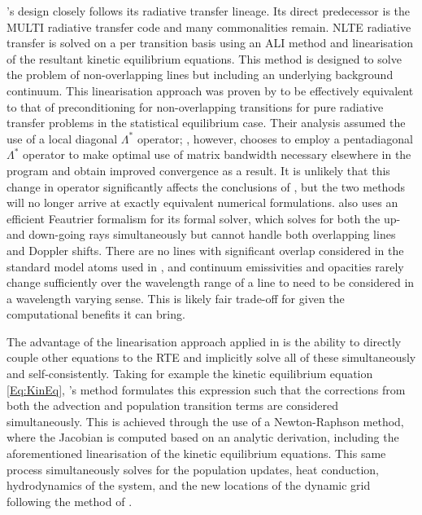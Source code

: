 \Radyn{}'s design closely follows its radiative transfer lineage. Its direct predecessor is the MULTI radiative transfer code \citep{Carlsson1992} and many commonalities remain.
NLTE radiative transfer is solved on a per transition basis using an ALI method and linearisation of the resultant kinetic equilibrium equations.
This method is designed to solve the problem of non-overlapping lines but including an underlying background continuum.
This linearisation approach was proven by \citet{SocasNavarro1997} to be effectively equivalent to that of preconditioning for non-overlapping transitions \citep[i.e. MALI, ][]{Rybicki1991} for pure radiative transfer problems in the statistical equilibrium case.
Their analysis assumed the use of a local diagonal $\Lambda^*$ operator; \Radyn{}, however, chooses to employ a pentadiagonal $\Lambda^*$ operator to make optimal use of matrix bandwidth necessary elsewhere in the program and obtain improved convergence as a result.
It is unlikely that this change in operator significantly affects the conclusions of \citet{SocasNavarro1997}, but the two methods will no longer arrive at exactly equivalent numerical formulations.
\Radyn{} also uses an efficient Feautrier formalism for its formal solver, which solves for both the up- and down-going rays simultaneously but cannot handle both overlapping lines and Doppler shifts.
There are no lines with significant overlap considered in the standard model atoms used in \Radyn{}, and continuum emissivities and opacities rarely change sufficiently over the wavelength range of a line to need to be considered in a wavelength varying sense.
This is likely fair trade-off for \Radyn{} given the computational benefits it can bring.

The advantage of the linearisation approach applied in \Radyn{} is the ability to directly couple other equations to the RTE and implicitly solve all of these simultaneously and self-consistently.
Taking for example the kinetic equilibrium equation \eqref{Eq:KinEq}, \Radyn{}'s method formulates this expression such that the corrections from both the advection and population transition terms are considered simultaneously.
This is achieved through the use of a Newton-Raphson method, where the Jacobian is computed based on an analytic derivation, including the aforementioned linearisation of the kinetic equilibrium equations.
This same process simultaneously solves for the population updates, heat conduction, hydrodynamics of the system, and the new locations of the dynamic grid following the method of \citet{Dorfi1987}.

